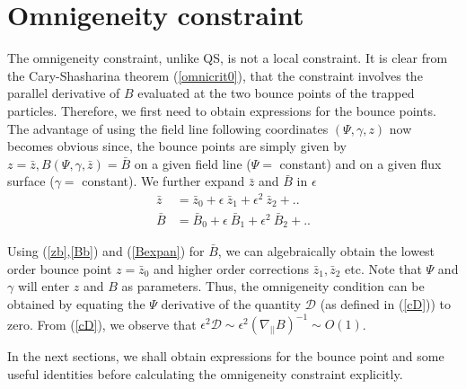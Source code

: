 \documentclass[aip,pop,reprint]{revtex4-1}
\newcommand*{\cD}{\mathcal{D}}
\newcommand*{\ep}{\epsilon}
\newcommand*{\dpl}{\nabla_{||}}
\newcommand*{\zb}{\bar{z}}
\newcommand*{\Bb}{\bar{B}}
\begin{document}
\section{Omnigeneity constraint }
\label{sec:omniconstraint}
The omnigeneity constraint, unlike QS, is not a local constraint. It is clear from the Cary-Shasharina theorem (\ref{omnicrit0}), that the constraint involves the parallel derivative of $B$ evaluated at the two bounce points of the trapped particles. Therefore, we first need to obtain expressions for the bounce points. The advantage of using the field line following coordinates $(\Psi,\gamma,z)$ now becomes obvious since, the bounce points are simply given by $z=\zb, B(\Psi,\gamma,\zb)=\Bb$ on a given field line ($\Psi=$ constant) and on a given flux surface ($\gamma=$ constant). We further expand $\zb$ and $\Bb$ in $\ep$  
\begin{subequations}
\begin{align}
\zb&=\zb_0 +\epsilon \: \zb_1+\epsilon^2 \: \zb_2 +..\label{zb}\\
\Bb&=\Bb_0 +\epsilon \: \Bb_1+\epsilon^2 \: \Bb_2 +..\label{Bb}
\end{align}
\end{subequations}

Using (\ref{zb},\ref{Bb}) and (\ref{Bexpan}) for $\Bb$, we can algebraically obtain the lowest order bounce point $z=\zb_0$ and higher order corrections $\zb_1,\zb_2$ etc. Note that $\Psi$ and $\gamma$ will enter $z$ and $B$ as parameters. Thus, the omnigeneity condition can be obtained by equating the $\Psi$ derivative of the quantity $\cD$ (as defined in (\ref{cD})) to zero. From (\ref{cD}), we observe that $\ep^2\cD \sim \ep^2 (\dpl B)^{-1}\sim O(1)$. 

In the next sections, we shall obtain expressions for the bounce point and some useful identities before calculating the omnigeneity constraint explicitly. 
\end{document}
